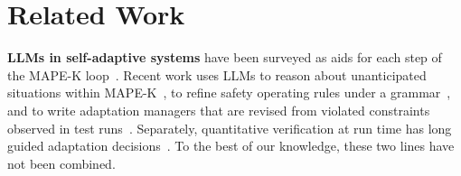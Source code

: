 
\section{Related Work}
\label{sec:related}

\textbf{LLMs in self-adaptive systems} have been surveyed as aids for each step of the MAPE-K loop~\cite{TODO-Li2024-LLMs-in-SAS,TODO-Li2025-GenAI-SAS-roadmap}.
Recent work uses LLMs to reason about unanticipated situations within MAPE-K~\cite{TODO-Maia2026-MAPER}, to refine safety operating rules under a grammar~\cite{TODO-SEAMS2026-grammar-constrained-rules}, and to write adaptation managers that are revised from violated constraints observed in test runs~\cite{TODO-Topfer2026-vibe-coding}.
Separately, quantitative verification at run time has long guided adaptation decisions~\cite{TODO-Calinescu2012-CACM-runtime-QV,TODO-Gerasimou2015-EvoChecker}.
To the best of our knowledge, these two lines have not been combined.

